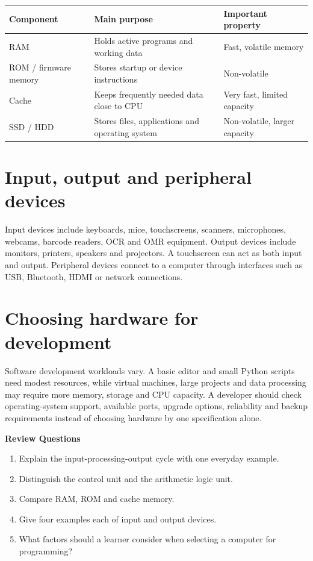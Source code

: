 \documentclass[11pt,openany,oneside]{book}
\newcommand{\reviewtitle}{\par\noindent\textbf{\color{Navy}Review Questions}\par}
\begin{document}
\begin{center}
\begin{tabularx}{\textwidth}{p{}XX}
\toprule
\textbf{Component} & \textbf{Main purpose} & \textbf{Important property}\\\midrule
RAM & Holds active programs and working data & Fast, volatile memory\\
ROM / firmware memory & Stores startup or device instructions & Non-volatile\\
Cache & Keeps frequently needed data close to CPU & Very fast, limited capacity\\
SSD / HDD & Stores files, applications and operating system & Non-volatile, larger capacity\\
\bottomrule
\end{tabularx}
\end{center}

\section{Input, output and peripheral devices}
Input devices include keyboards, mice, touchscreens, scanners, microphones, webcams, barcode readers, OCR and OMR equipment. Output devices include monitors, printers, speakers and projectors. A touchscreen can act as both input and output. Peripheral devices connect to a computer through interfaces such as USB, Bluetooth, HDMI or network connections.

\section{Choosing hardware for development}
Software development workloads vary. A basic editor and small Python scripts need modest resources, while virtual machines, large projects and data processing may require more memory, storage and CPU capacity. A developer should check operating-system support, available ports, upgrade options, reliability and backup requirements instead of choosing hardware by one specification alone.

\reviewtitle
\begin{enumerate}
\item Explain the input-processing-output cycle with one everyday example.
\item Distinguish the control unit and the arithmetic logic unit.
\item Compare RAM, ROM and cache memory.
\item Give four examples each of input and output devices.
\item What factors should a learner consider when selecting a computer for programming?
\end{enumerate}
\end{document}
